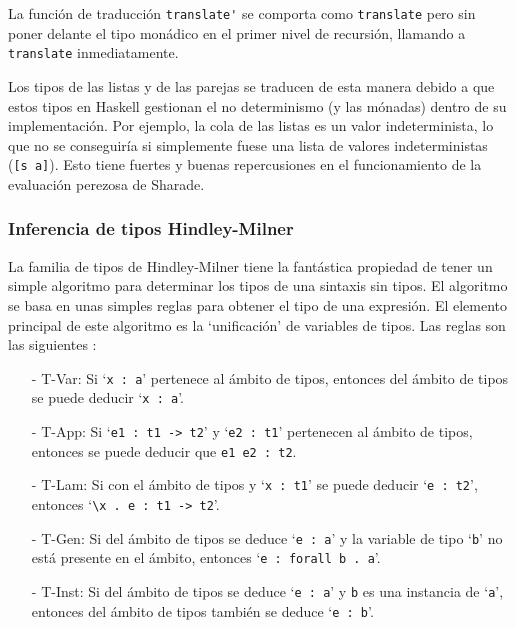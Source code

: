 \documentclass[class=article, crop=false]{standalone}
\begin{document}
La función de traducción \verb`translate'` se comporta como \verb`translate` pero sin poner
delante el tipo monádico en el primer nivel de recursión, llamando a \verb`translate`
inmediatamente.

Los tipos de las listas y de las parejas se traducen de esta manera debido a que estos tipos
en Haskell gestionan el no determinismo (y las mónadas) dentro de su implementación. Por
ejemplo, la cola de las listas es un valor indeterminista, lo que no se conseguiría si
simplemente fuese una lista de valores indeterministas (\verb`[s a]`). Esto tiene fuertes
y buenas repercusiones en el funcionamiento de la evaluación perezosa de Sharade.

\subsubsection{Inferencia de tipos Hindley-Milner}

La familia de tipos de Hindley-Milner tiene la fantástica propiedad de tener un simple
algoritmo para determinar los tipos de una sintaxis sin tipos. El algoritmo se basa en unas
simples reglas para obtener el tipo de una expresión. El elemento principal de este algoritmo
es la `unificación' de variables de tipos. Las reglas son las siguientes
\cite{write-you-a-haskell}\cite{hindley1969principal}\cite{milner1978theory}:
\begin{itemize}
  \item[-] T-Var: Si `\verb`x : a`' pertenece al ámbito de tipos, entonces del ámbito de
  tipos se puede deducir `\verb`x : a`'.

  \item[-] T-App: Si `\verb`e1 : t1 -> t2`' y `\verb`e2 : t1`' pertenecen al ámbito de tipos,
  entonces se puede deducir que \verb`e1 e2 : t2`.
  
  \item[-] T-Lam: Si con el ámbito de tipos y `\verb`x : t1`' se puede deducir
  `\verb`e : t2`', entonces `\verb`\x . e : t1 -> t2`'.
  
  \item[-] T-Gen: Si del ámbito de tipos se deduce `\verb`e : a`' y la variable de tipo
  `\verb`b`' no está presente en el ámbito, entonces `\verb`e : forall b . a`'.

  \item[-] T-Inst: Si del ámbito de tipos se deduce `\verb`e : a`' y \verb`b` es una
  instancia de `\verb`a`', entonces del ámbito de tipos también se deduce `\verb`e : b`'.
\end{itemize}
\end{document}
